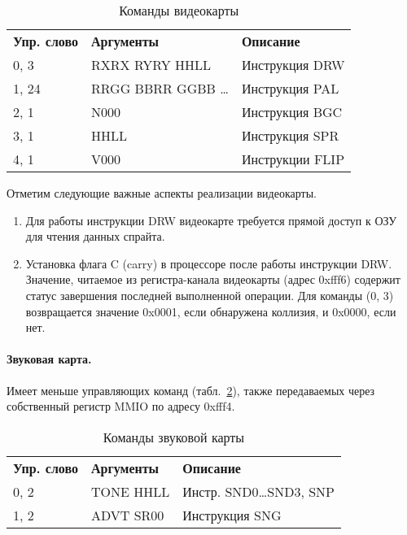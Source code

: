 \begin{table}[htb]
\begin{center}
\begin{tabular}{lll}
\textbf{Упр. слово} & \textbf{Аргументы}   &  \textbf{Описание} \\
0, 3                & RXRX RYRY HHLL       &  Инструкция DRW\\
1, 24               & RRGG BBRR GGBB \dots &  Инструкция PAL \\
2, 1                & N000                 &  Инструкция BGC \\
3, 1                & HHLL                 &  Инструкция SPR \\
4, 1                & V000                 &  Инструкции FLIP \\
\end{tabular}
\end{center}
\caption{Команды видеокарты}
\label{tab:video-commands}
\end{table}

Отметим следующие важные аспекты реализации видеокарты.
\begin{enumerate}
    \item Для работы инструкции DRW видеокарте требуется прямой доступ к ОЗУ для чтения данных спрайта.
    \item Установка флага C (carry) в процессоре после работы инструкции DRW. Значение, читаемое из регистра-канала видеокарты (адрес 0xfff6) содержит статус завершения последней выполненной операции. Для команды (0, 3) возвращается значение 0x0001, если обнаружена коллизия, и 0x0000, если нет.
\end{enumerate}

\paragraph{Звуковая карта.} Имеет меньше управляющих команд (табл.~\ref{tab:sound-commands}), также передаваемых через собственный регистр MMIO по адресу 0xfff4.

\begin{table}[htb]
\begin{center}
\begin{tabular}{lll}
\textbf{Упр. слово} & \textbf{Аргументы}  &  \textbf{Описание} \\
0, 2                &  TONE HHLL &  Инстр. SND0\dots{}SND3, SNP \\
1, 2                &  ADVT SR00 &  Инструкция SNG \\
\end{tabular}
\end{center}
\caption{Команды звуковой карты}
\label{tab:sound-commands}
\end{table}

